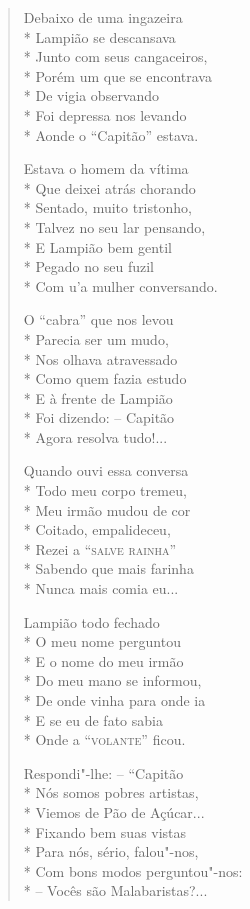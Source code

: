 \begin{verse}
Debaixo de uma ingazeira\\*
Lampião se descansava\\*
Junto com seus cangaceiros,\\*
Porém um que se encontrava\\*
De vigia observando\\*
Foi depressa nos levando\\*
Aonde o ``Capitão'' estava.

Estava o homem da vítima\\*
Que deixei atrás chorando\\*
Sentado, muito tristonho,\\*
Talvez no seu lar pensando,\\*
E Lampião bem gentil\\*
Pegado no seu fuzil\\*
Com u'a mulher conversando.

O ``cabra'' que nos levou\\*
Parecia ser um mudo,\\*
Nos olhava atravessado\\*
Como quem fazia estudo\\*
E à frente de Lampião\\*
Foi dizendo: --  Capitão\\*
Agora resolva tudo!...

Quando ouvi essa conversa\\*
Todo meu corpo tremeu,\\*
Meu irmão mudou de cor\\*
Coitado, empalideceu,\\*
Rezei a ``\textsc{salve rainha}''\\*
Sabendo que mais farinha\\*
Nunca mais comia eu...

Lampião todo fechado\\*
O meu nome perguntou\\*
E o nome do meu irmão\\*
Do meu mano se informou,\\*
De onde vinha para onde ia\\*
E se eu de fato sabia\\*
Onde a ``\textsc{volante}'' ficou.

Respondi"-lhe: --  ``Capitão\\*
Nós somos pobres artistas,\\*
Viemos de Pão de Açúcar...\\*
Fixando bem suas vistas\\*
Para nós, sério, falou"-nos,\\*
Com bons modos perguntou"-nos:\\*
--  Vocês são Malabaristas?...


\end{verse}
